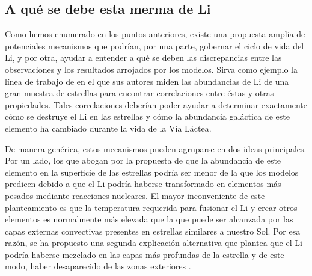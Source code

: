 \subsection{A qué se debe esta merma de Li}
Como hemos enumerado en los puntos anteriores, existe una propuesta amplia de potenciales mecanismos que podrían, por una parte, gobernar el ciclo de vida del Li, y por otra, ayudar a entender a qué se deben las discrepancias entre las observaciones y los resultados arrojados por los modelos. Sirva como ejemplo la línea de trabajo de \cite{Ramirez2012} en el que sus autores miden las abundancias de Li de una gran muestra de estrellas para encontrar correlaciones entre éstas y otras propiedades. Tales correlaciones deberían poder ayudar a determinar exactamente cómo se destruye el Li en las estrellas y cómo la abundancia galáctica de este elemento ha cambiado durante la vida de la Vía Láctea.\par 

De manera genérica, estos mecanismos pueden agruparse en dos ideas principales. Por un lado, los que abogan por la propuesta de que la abundancia de este elemento en la superficie de las estrellas podría ser menor de la que los modelos predicen debido a que el Li podría haberse transformado en elementos más pesados mediante reacciones nucleares. El mayor inconveniente de este planteamiento es que la temperatura requerida para fusionar el Li y crear otros elementos es normalmente más elevada que la que puede ser alcanzada por las capas externas convectivas presentes en estrellas similares a nuestro Sol. Por esa razón, se ha propuesto una segunda explicación alternativa que plantea que el Li podría haberse mezclado en las capas más profundas de la estrella y de este modo, haber desaparecido de las zonas exteriores \cite{Pinsonneault1997}.\par




